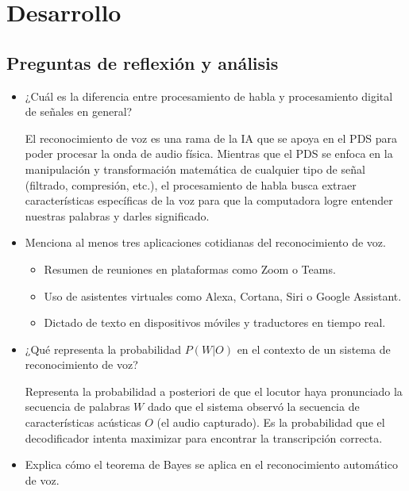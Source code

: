 \documentclass[12pt]{article}
\begin{document}
	
	\newpage
	\tableofcontents %
	\vspace{1cm}
	\listoffigures    %
	\newpage
	
	
	\section{Desarrollo}
	\subsection{Preguntas de reflexión y análisis}
	
	\begin{itemize}
		\item ¿Cuál es la diferencia entre procesamiento de habla y procesamiento digital de señales en general?
		
		El reconocimiento de voz es una rama de la IA que se apoya en el PDS para poder procesar la onda de audio física. Mientras que el PDS se enfoca en la manipulación y transformación matemática de cualquier tipo de señal (filtrado, compresión, etc.), el procesamiento de habla busca extraer características específicas de la voz para que la computadora logre entender nuestras palabras y darles significado.
		
		\item Menciona al menos tres aplicaciones cotidianas del reconocimiento de voz.
		
		\begin{itemize}
			\item Resumen de reuniones en plataformas como Zoom o Teams.
			\item Uso de asistentes virtuales como Alexa, Cortana, Siri o Google Assistant.
			\item Dictado de texto en dispositivos móviles y traductores en tiempo real.
		\end{itemize}
		
		\item ¿Qué representa la probabilidad $P(W | O)$ en el contexto de un sistema de reconocimiento de voz?
		
		Representa la probabilidad a posteriori de que el locutor haya pronunciado la secuencia de palabras $W$ dado que el sistema observó la secuencia de características acústicas $O$ (el audio capturado). Es la probabilidad que el decodificador intenta maximizar para encontrar la transcripción correcta.
		
		\item Explica cómo el teorema de Bayes se aplica en el reconocimiento automático de voz. 
		

\end{itemize}
\end{document}
